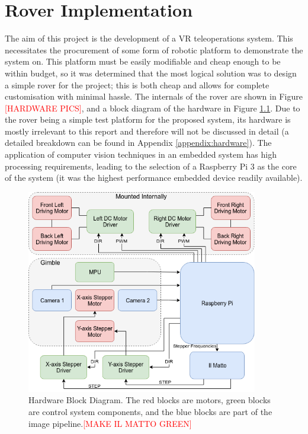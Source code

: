 \chapter{Rover Implementation}
\label{chapter:rover}

The aim of this project is the development of a VR teleoperations system. This necessitates the procurement of some form of robotic platform to demonstrate the system on. This platform must be easily modifiable and cheap enough to be within budget, so it was determined that the most logical solution was to design a simple rover for the project; this is both cheap and allows for complete customisation with minimal hassle. The internals of the rover are shown in Figure \textcolor{red}{[HARDWARE PICS]}, and a block diagram of the hardware in Figure \ref{fig:hardware}. Due to the rover being a simple test platform for the proposed system, its hardware is mostly irrelevant to this report and therefore will not be discussed in detail (a detailed breakdown can be found in Appendix \ref{appendix:hardware}). The application of computer vision techniques in an embedded system has high processing requirements, leading to the selection of a Raspberry Pi 3 as the core of the system (it was the highest performance embedded device readily available). 

\begin{figure}[H]
    \begin{center}
      \includegraphics[width=0.9\textwidth]{Figures/hardware.png}
      \caption[Hardware Block Diagram]{Hardware Block Diagram. The red blocks are motors, green blocks are control system components, and the blue blocks are part of the image pipeline.\textcolor{red}{[MAKE IL MATTO GREEN]}}
      \label{fig:hardware}
    \end{center}
\end{figure}


